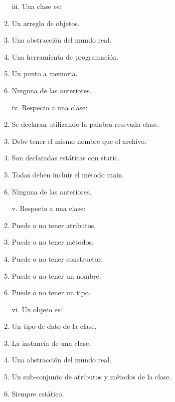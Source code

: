 \documentclass[10pt]{article}
\begin{document}
{\begin{enumerate}
\begin{multicols}{2}
    \begin{enumerate}[label=(\alph*)]
        \item[iii.] Una clase es: 
        \item Un arreglo de objetos.
        \item Una abstracci\'on del mundo real.
        \item Una herramienta de programaci\'on.
        \item Un punto a memoria.
        \item Ninguna de las anteriores.
    \end{enumerate}

    \begin{enumerate}[label=(\alph*)]
        \item[iv.] Respecto a una clase:
        \item Se declaran utilizando la palabra resevada clase.
        \item Debe tener el mismo nombre que el archivo.
        \item Son declaradas est\'aticas con static.
        \item Todas deben incluir el m\'etodo main.
        \item Ninguna de las anteriores.
    \end{enumerate}

    \begin{enumerate}[label=(\alph*)]
        \item[v.] Respecto a una clase:
        \item Puede o no tener atributos.
        \item Puede o no tener m\'etodos.
        \item Puede o no tener constructor.
        \item Puede o no tener un nombre.
        \item Puede o no tener un tipo.
    \end{enumerate}
    
    \begin{enumerate}[label=(\alph*)]
        \item[vi.] Un objeto es: 
        \item Un tipo de dato de la clase.
        \item La instancia de una clase.
        \item Una abstracci\'on del mundo real.        
        \item Un sub-conjunto de atributos y m\'etodos de la clase.
        \item Siempre est\'atico.
    \end{enumerate}


\end{multicols}
\end{enumerate}}
\end{document}
